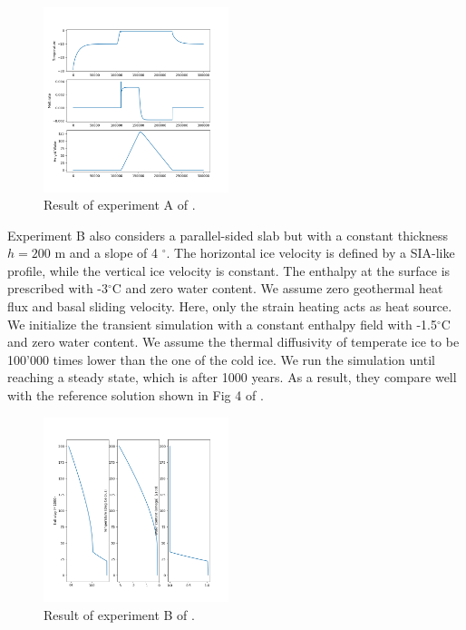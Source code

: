 \documentclass[gmd]{copernicus}
\begin{document}
\begin{figure}[!h]
\begin{center} 
\includegraphics[width=0.48\textwidth]{fig/KleinerExpA.png}   
\end{center}
\caption{ Result of experiment A of \citep{kleiner2015enthalpy}. \label{KleinerExpA}}
\end{figure}

Experiment B also considers a parallel-sided slab but with a constant thickness $h=200$ m
and a slope of 4 $^{\circ}$. The horizontal ice velocity is defined by a SIA-like profile, 
while the vertical ice velocity is constant. 
The enthalpy at the surface is prescribed with -3$^{\circ}$C and zero water content.
We assume zero geothermal heat flux and basal sliding velocity.
Here, only the strain heating acts as heat source. We initialize 
the transient simulation with a constant enthalpy field with -1.5$^{\circ}$C 
and zero water content. We assume the thermal diffusivity of temperate ice to be 
100'000 times lower than the one of the cold ice. We run the simulation until
reaching a steady state, which is after 1000 years.
As a result, they compare well with 
the reference solution shown in Fig 4 of \citep{kleiner2015enthalpy}. 

\begin{figure}[!h]
\begin{center} 
\includegraphics[width=0.48\textwidth]{fig/KleinerExpB.png}   
\end{center}
\caption{ Result of experiment B of \citep{kleiner2015enthalpy}. \label{KleinerExpB}}
\end{figure}
\end{document}
